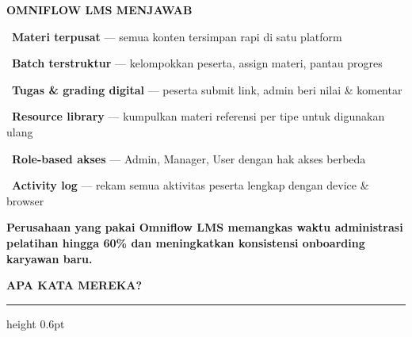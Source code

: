 \documentclass[a4paper]{article}
\newcommand{\sectiontitle}[1]{%
    \vspace{10pt}%
    {\fontsize{13}{16}\selectfont\bfseries\color{BlueDark} #1}\par\vspace{3pt}%
    {\color{BluePrimary}\hrule height 0.6pt}\par\vspace{8pt}%
}
\begin{document}
\begin{minipage}[t]{0.485\textwidth}
    \colorbox{VioletPrimary}{%
        \begin{minipage}{\dimexpr\textwidth-2\fboxsep\relax}
            {\fontsize{10}{13}\selectfont\bfseries\color{White} OMNIFLOW LMS MENJAWAB}
        \end{minipage}}\par
    \vspace{4pt}

    {\fontsize{9.5}{13}\selectfont\color{TextDark}%
    \textbullet\ \textbf{Materi terpusat} --- semua konten tersimpan rapi di satu platform\par\vspace{4pt}%
    \textbullet\ \textbf{Batch terstruktur} --- kelompokkan peserta, assign materi, pantau progres\par\vspace{4pt}%
    \textbullet\ \textbf{Tugas \& grading digital} --- peserta submit link, admin beri nilai \& komentar\par\vspace{4pt}%
    \textbullet\ \textbf{Resource library} --- kumpulkan materi referensi per tipe untuk digunakan ulang\par\vspace{4pt}%
    \textbullet\ \textbf{Role-based akses} --- Admin, Manager, User dengan hak akses berbeda\par\vspace{4pt}%
    \textbullet\ \textbf{Activity log} --- rekam semua aktivitas peserta lengkap dengan device \& browser}%
\end{minipage}

\vspace{8pt}

{\setlength{\fboxsep}{7pt}\setlength{\fboxrule}{0pt}%
\noindent\colorbox{VioletPrimary}{%
    \begin{minipage}{\dimexpr\textwidth-2\fboxsep\relax}
        \centering
        {\fontsize{9.5}{12}\selectfont\bfseries\color{White}
        Perusahaan yang pakai Omniflow LMS memangkas \textbf{waktu administrasi pelatihan hingga 60\%} dan meningkatkan konsistensi onboarding karyawan baru.}
    \end{minipage}}}

\vspace{8pt}
\sectiontitle{APA KATA MEREKA?}
\end{document}
